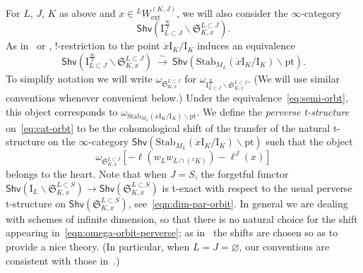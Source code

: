 \documentclass[11pt]{amsart}
\numberwithin{equation}{section}
\theoremstyle{plain}
\theoremstyle{definition}
\newcommand{\I}{{\mathrm I}}
\renewcommand{\k}{\Bbbk}
\newcommand{\xs}{{\ \xrightarrow{\sim}\ }}
\newcommand{\pt}{\mathrm{pt}}
\newcommand{\semi}{{{\frac{\infty}{2}}}}
\newcommand{\ex}{\mathrm{ext}}
\newcommand{\Shv}{\mathsf{Shv}}
\newcommand{\rS}{\mathfrak{S}}
\begin{document}
For $L$, $J$, $K$ as above and $x \in {}^LW_\ex^{(K,J)}$,
we will also consider the $\infty$-category 
\begin{equation}
\label{eq:cat-orbt}
\Shv \left( \I^{\semi}_{L \subset J} \backslash \rS^{L \subset J}_{K,x} \right).
\end{equation}
As in~\cite[Proposition~1.3.5]{Gaits18} or \cite[Lemma~3.3.2]{DL23}, $!$-restriction to the point $\dot{x}\I_K/\I_K$ induces an equivalence 
\begin{equation}
\label{eq:semi-orbt}
\Shv \left( \I^{\semi}_{L \subset J} \backslash \rS^{L \subset J}_{K,x} \right) \xs \Shv \left( \mathrm{Stab}_{M_L}(\dot{x}\I_K/\I_K)\backslash \pt \right).
\end{equation}
To simplify notation we will write $\omega_{\rS^{L \subset J}_{K,x}}$ for $\omega_{\I^{\semi}_{L \subset J} \backslash \rS^{L \subset J}_{K,x}}$. (We will use similar conventions whenever convenient below.) Under the equivalence~\eqref{eq:semi-orbt}, this object corresponds to $\omega_{\mathrm{Stab}_{M_L}(\dot{x}\I_K/\I_K)\backslash \pt}$.
We define the \textit{perverse t-structure} on~\eqref{eq:cat-orbt} to be the cohomological shift of the transfer of the natural t-structure on the $\infty$-category $\Shv \left( \mathrm{Stab}_{M_L}(\dot{x}\I_K/\I_K)\backslash \pt \right)$ such that the object
\begin{equation}
\label{eqn:omega-orbit-perverse}
\omega_{\rS^{L \subset J}_{K,x}}[-\ell(w_Lw_{L\cap ({}^xK)})-\ell^J(x)]
\end{equation}
belongs to the heart. 
Note that when $J=S$, the forgetful functor $\Shv(\I_L \backslash \rS^{L \subset S}_{K,x}) \to \Shv(\rS^{L \subset S}_{K,x})$ is t-exact with respect to the usual perverse t-structure on $\Shv(\rS^{L \subset S}_{K,x})$, see~\eqref{eqn:dim-par-orbit}. In general we are dealing with schemes of infinite dimension, so that there is no natural choice for the shift appearing in~\eqref{eqn:omega-orbit-perverse}; as in~\cite{adr} the shifts are chosen so as to provide a nice theory. (In particular, when $L=J=\varnothing$, our conventions are consistent with those in~\cite{adr}.)
\end{document}
